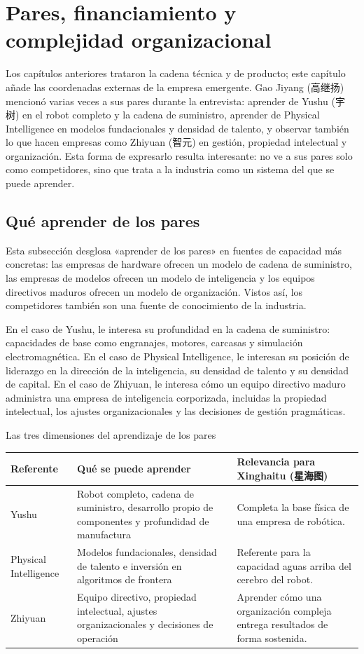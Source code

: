\documentclass[a4paper]{article}
\begin{document}
\section{Pares, financiamiento y complejidad organizacional}

Los capítulos anteriores trataron la cadena técnica y de producto; este capítulo añade las coordenadas externas de la empresa emergente. Gao Jiyang (高继扬) mencionó varias veces a sus pares durante la entrevista: aprender de Yushu (宇树) en el robot completo y la cadena de suministro, aprender de Physical Intelligence en modelos fundacionales y densidad de talento, y observar también lo que hacen empresas como Zhiyuan (智元) en gestión, propiedad intelectual y organización. Esta forma de expresarlo resulta interesante: no ve a sus pares solo como competidores, sino que trata a la industria como un sistema del que se puede aprender.

\subsection{Qué aprender de los pares}

Esta subsección desglosa «aprender de los pares» en fuentes de capacidad más concretas: las empresas de hardware ofrecen un modelo de cadena de suministro, las empresas de modelos ofrecen un modelo de inteligencia y los equipos directivos maduros ofrecen un modelo de organización. Vistos así, los competidores también son una fuente de conocimiento de la industria.

En el caso de Yushu, le interesa su profundidad en la cadena de suministro: capacidades de base como engranajes, motores, carcasas y simulación electromagnética. En el caso de Physical Intelligence, le interesan su posición de liderazgo en la dirección de la inteligencia, su densidad de talento y su densidad de capital. En el caso de Zhiyuan, le interesa cómo un equipo directivo maduro administra una empresa de inteligencia corporizada, incluidas la propiedad intelectual, los ajustes organizacionales y las decisiones de gestión pragmáticas.

\begin{knowledgebox}{Las tres dimensiones del aprendizaje de los pares}
\begin{tabularx}{\textwidth}{p{}p{}X}
\toprule
Referente & Qué se puede aprender & Relevancia para Xinghaitu (星海图) \\
\midrule
Yushu & Robot completo, cadena de suministro, desarrollo propio de componentes y profundidad de manufactura & Completa la base física de una empresa de robótica. \\
Physical Intelligence & Modelos fundacionales, densidad de talento e inversión en algoritmos de frontera & Referente para la capacidad aguas arriba del cerebro del robot. \\
Zhiyuan & Equipo directivo, propiedad intelectual, ajustes organizacionales y decisiones de operación & Aprender cómo una organización compleja entrega resultados de forma sostenida. \\
\bottomrule
\end{tabularx}
\end{knowledgebox}
\end{document}
